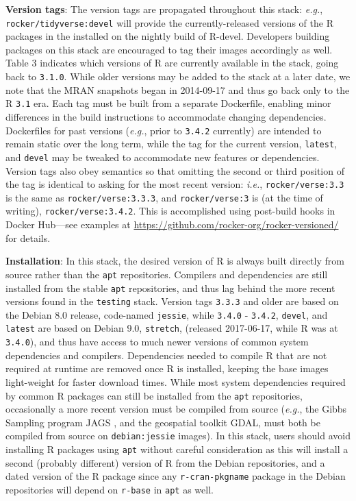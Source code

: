 \textbf{Version tags}: The version tags are propagated throughout this
stack: \emph{e.g.}, \texttt{rocker/tidyverse:devel} will provide the
currently-released versions of the R packages in the 
\citep{tidyverse} installed on the nightly build of R-devel. Developers
building packages on this stack are encouraged to tag their images
accordingly as well. Table 3 indicates which versions of R are currently
available in the stack, going back to \texttt{3.1.0}. While older
versions may be added to the stack at a later date, we note that the
MRAN snapshots began in 2014-09-17 and thus go back only to the R
\texttt{3.1} era. Each tag must be built from a separate Dockerfile,
enabling minor differences in the build instructions to accommodate
changing dependencies. Dockerfiles for past versions (\emph{e.g.}, prior
to \texttt{3.4.2} currently) are intended to remain static over the long
term, while the tag for the current version, \texttt{latest}, and
\texttt{devel} may be tweaked to accommodate new features or
dependencies. Version tags also obey semantics so that omitting the
second or third position of the tag is identical to asking for the most
recent version: \emph{i.e.}, \texttt{rocker/verse:3.3} is the same as
\texttt{rocker/verse:3.3.3}, and \texttt{rocker/verse:3} is (at the time
of writing), \texttt{rocker/verse:3.4.2}. This is accomplished using
post-build hooks in Docker Hub---see examples at
\url{https://github.com/rocker-org/rocker-versioned/} for details.

\textbf{Installation}: In this stack, the desired version of R is always
built directly from source rather than the \texttt{apt} repositories.
Compilers and dependencies are still installed from the stable
\texttt{apt} repositories, and thus lag behind the more recent versions
found in the \texttt{testing} stack. Version tags \texttt{3.3.3} and
older are based on the Debian 8.0 release, code-named \texttt{jessie},
while \texttt{3.4.0} - \texttt{3.4.2}, \texttt{devel}, and
\texttt{latest} are based on Debian 9.0, \texttt{stretch}, (released
2017-06-17, while R was at \texttt{3.4.0}), and thus have access to much
newer versions of common system dependencies and compilers. Dependencies
needed to compile R that are not required at runtime are removed once R
is installed, keeping the base images light-weight for faster download
times. While most system dependencies required by common R packages can
still be installed from the \texttt{apt} repositories, occasionally a
more recent version must be compiled from source (\emph{e.g.}, the Gibbs
Sampling program JAGS \citep{jags}, and the geospatial toolkit GDAL,
must both be compiled from source on \texttt{debian:jessie} images). In
this stack, users should avoid installing R packages using \texttt{apt}
without careful consideration as this will install a second (probably
different) version of R from the Debian repositories, and a dated
version of the R package since any \texttt{r-cran-pkgname} package in
the Debian repositories will depend on \texttt{r-base} in \texttt{apt}
as well.

